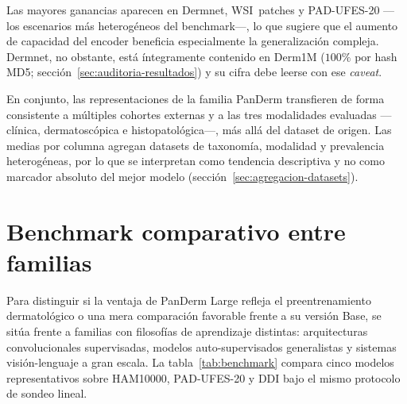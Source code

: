 Las mayores ganancias aparecen en Dermnet, WSI~patches y PAD-UFES-20
---los escenarios más heterogéneos del benchmark---, lo que sugiere
que el aumento de capacidad del encoder beneficia especialmente la
generalización compleja. Dermnet, no obstante, está íntegramente
contenido en Derm1M ($100\%$ por hash MD5;
sección~\ref{sec:auditoria-resultados}) y su cifra debe leerse con ese
\emph{caveat}.

En conjunto, las representaciones de la familia PanDerm transfieren de
forma consistente a múltiples cohortes externas y a las tres modalidades
evaluadas ---clínica, dermatoscópica e histopatológica---, más allá del
dataset de origen. Las medias por columna agregan datasets de taxonomía,
modalidad y prevalencia heterogéneas, por lo que se interpretan como
tendencia descriptiva y no como marcador absoluto del mejor modelo
(sección~\ref{sec:agregacion-datasets}).

\section{Benchmark comparativo entre familias}
\label{sec:benchmark}

Para distinguir si la ventaja de PanDerm Large refleja el
preentrenamiento dermatológico o una mera comparación favorable
frente a su versión Base, se sitúa frente a familias con filosofías
de aprendizaje distintas: arquitecturas convolucionales supervisadas,
modelos auto-supervisados generalistas y sistemas visión-lenguaje a
gran escala. La tabla~\ref{tab:benchmark} compara cinco modelos
representativos sobre HAM10000, PAD-UFES-20 y DDI bajo el mismo
protocolo de sondeo lineal.

